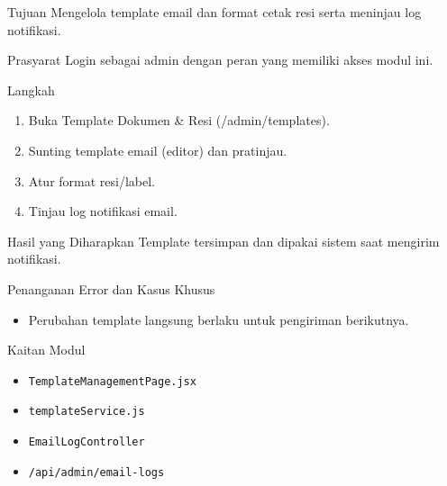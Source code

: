 
\begin{flowsection}{Tujuan}
Mengelola template email dan format cetak resi serta meninjau log notifikasi.
\end{flowsection}

\begin{flowsection}{Prasyarat}
Login sebagai admin dengan peran yang memiliki akses modul ini.
\end{flowsection}

\begin{flowsection}{Langkah}
\begin{enumerate}
  \item Buka Template Dokumen \&  Resi (/admin/templates).
  \item Sunting template email (editor) dan pratinjau.
  \item Atur format resi/label.
  \item Tinjau log notifikasi email.
\end{enumerate}
\end{flowsection}


\begin{flowsection}{Hasil yang Diharapkan}
Template tersimpan dan dipakai sistem saat mengirim notifikasi.
\end{flowsection}

\begin{flowsection}{Penanganan Error dan Kasus Khusus}
\begin{itemize}
  \item Perubahan template langsung berlaku untuk pengiriman berikutnya.
\end{itemize}
\end{flowsection}

\begin{flowsection}{Kaitan Modul}
\begin{itemize}
  \item \texttt{TemplateManagementPage.jsx}
  \item \texttt{templateService.js}
  \item \texttt{EmailLogController}
  \item \texttt{/api/admin/email-logs}
\end{itemize}
\end{flowsection}

